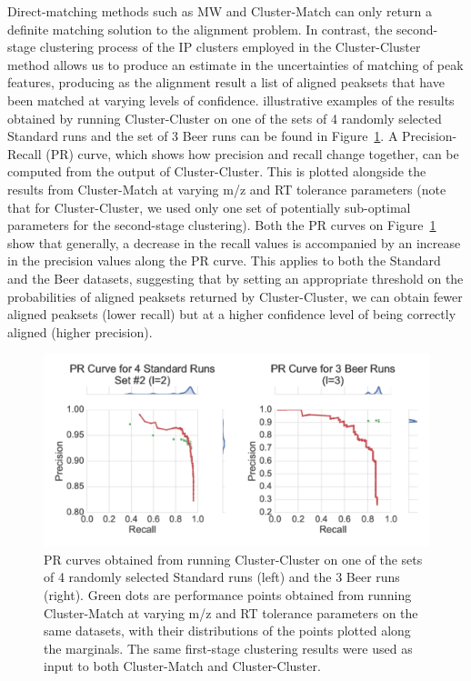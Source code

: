 Direct-matching methods such as MW and Cluster-Match can only return a definite matching solution to the alignment problem. In contrast, the second-stage clustering process of the IP clusters employed in the Cluster-Cluster method allows us to produce an estimate in the uncertainties of matching of peak features, producing as the alignment result a list of aligned peaksets that have been matched at varying levels of confidence. illustrative examples of the results obtained by running Cluster-Cluster on one of the sets of 4 randomly selected Standard runs and the set of 3 Beer runs can be found in Figure~\ref{fig:pr-curve}. A Precision-Recall (PR) curve, which shows how precision and recall change together, can be computed from the output of Cluster-Cluster. This is plotted alongside the results from Cluster-Match at varying m/z and RT tolerance parameters (note that for Cluster-Cluster, we used only one set of potentially sub-optimal parameters for the second-stage clustering). Both the PR curves on Figure~\ref{fig:pr-curve} show that generally, a decrease in the recall values is accompanied by an increase in the precision values along the PR curve. This applies to both the Standard and the Beer datasets, suggesting that by setting an appropriate threshold on the probabilities of aligned peaksets returned by Cluster-Cluster, we can obtain fewer aligned peaksets (lower recall) but at a higher confidence level of being correctly aligned (higher precision).

\begin{figure}[!htbp]
\centering
\includegraphics[width=1.0\linewidth]{05-precursor-cluster/figures/fig4.pdf}
\caption{\label{fig:pr-curve} PR curves obtained from running Cluster-Cluster on one of the sets of 4 randomly selected Standard runs (left) and the 3 Beer runs (right). Green dots are performance points obtained from running Cluster-Match at varying m/z and RT tolerance parameters on the same datasets, with their distributions of the points plotted along the marginals. The same first-stage clustering results were used as input to both Cluster-Match and Cluster-Cluster.}
\end{figure}

